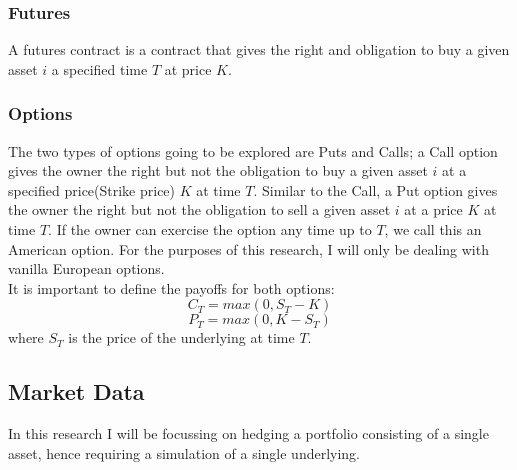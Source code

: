 \documentclass[12pt]{article}
\numberwithin{equation}{section}
\begin{document}
\subsubsection{Futures}
A futures contract is a contract that gives the right and obligation to buy a 
given asset $i$ a specified time $T$ at price $K$. 
\subsubsection{Options}
The two types of options going to be explored are Puts and Calls; a Call option 
gives the owner the right but not the obligation to buy a given asset $i$ at 
a specified price(Strike price) $K$ at time $T$. Similar to the Call, a Put option gives the 
owner the right but not the obligation to sell a given asset $i$ at a price $K$ 
at time $T$. If the owner can exercise the option any time up to $T$, we call 
this an American option. For the purposes of this research, I will only be 
dealing with vanilla European options.\\ 
It is important to define the payoffs for both options: 
\begin{equation}
C_T = max(0,S_T-K)
\end{equation}
\begin{equation}
P_T = max(0,K-S_T)
\end{equation}
where $S_T$ is the price of the underlying at time $T$. 


\subsection{Market Data}
In this research I will be focussing on hedging a portfolio consisting of a single 
asset, hence requiring a simulation of a single underlying. 
\end{document}
